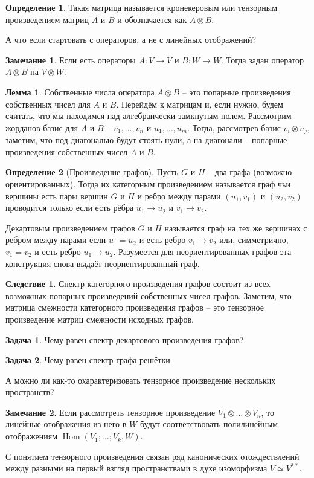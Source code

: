 \documentclass[10pt,a4paper,oneside]{book}
\theoremstyle{definition}
\newtheorem*{rem}{\color{green!50!blue}Замечание}
\newtheorem{zad}{\color{violet!100!black}Задача}
\newtheorem*{defn}{\color{yellow!30!red} Определение}
\newtheorem{lem}{\color{green!50!black}Лемма}
\newtheorem{cor}{\color{green!45!black}Следствие}
\newcommand{\Hom}{\operatorname{Hom}}
\def\dfn{\begin{defn}}
\def\edfn{\end{defn}}
\def\lm{\begin{lem}}
\def\elm{\end{lem}}
\def\zd{\begin{zad}}
\def\ezd{\end{zad}}
\def\crl{\begin{cor}}
\def\ecrl{\end{cor}}
\def\rm{\begin{rem}}
\def\erm{\end{rem}}
\begin{document}
\dfn Такая матрица называется кронекеровым или тензорным произведением матриц $A$ и $B$ и обозначается как $A\otimes B$.
\edfn

А что если стартовать с операторов, а не с линейных отображений?

\rm Если есть операторы $A\colon V \to V$ и $B \colon W \to W$. Тогда задан оператор $A\otimes B$ на $V\otimes W$.
\erm

\lm Собственные числа оператора $A\otimes B$  -- это попарные произведения собственных чисел для $A$ и $B$. 
\proof Перейдём к матрицам и, если нужно, будем считать, что мы находимся над алгебраически замкнутым полем. Рассмотрим жорданов базис для $A$ и $B$ -- $v_1,\dots,v_n$ и $u_1,\dots, u_m$. Тогда, рассмотрев базис $v_i\otimes u_j$, заметим, что под диагональю будут стоять нули, а на диагонали -- попарные произведения собственных чисел $A$ и $B$.
\endproof
\elm


 

\dfn[Произведение графов] Пусть $G$ и $H$ -- два графа (возможно ориентированных). Тогда их категорным произведением называется граф чьи вершины есть пары вершин $G$ и $H$ и ребро между парами $(u_1,v_1)$ и $(u_2,v_2)$ проводится только если есть рёбра $u_1 \to u_2$ и $v_1 \to v_2$.

Декартовым произведением графов $G$ и $H$ называется граф на тех же вершинах с ребром между парами если $u_1=u_2$ и есть ребро $v_1\to v_2$ или, симметрично, $v_1=v_2$ и есть ребро $u_1 \to u_2$. Разумеется для неориентированных графов эта конструкция снова выдаёт неориентированный граф.
\edfn


\crl Спектр категорного произведения графов состоит из всех возможных попарных произведений собственных чисел графов.
\proof Заметим, что матрица смежности категорного произведения графов -- это тензорное произведение матриц смежности исходных графов.
\endproof
\ecrl



\zd Чему равен спектр декартового произведения графов?
\ezd

\zd Чему равен спектр графа-решётки
\ezd

А можно ли как-то охарактеризовать тензорное произведение нескольких пространств?

\rm Если рассмотреть тензорное произведение $V_1\otimes \dots \otimes V_n$, то линейные отображения из него в $W$ будут соответствовать полилинейным отображениям $\Hom(V_1;\dots ;V_k, W)$.
\erm

С понятием тензорного произведения связан ряд канонических отождествлений между разными на первый взгляд пространствами в духе изоморфизма $V \simeq V^{**}$.
\end{document}
